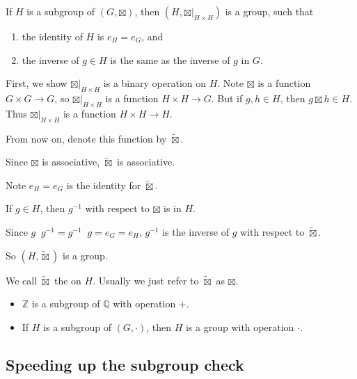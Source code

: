 \documentclass[12pt,letterpaper]{report}
\begin{document}
\begin{prop}{}{}
  If $H$ is a subgroup of $(G, \boxtimes)$, then $(H, \boxtimes \rvert_{H \times H})$ is a group,
  such that
  \begin{enumerate}
    \item the identity of $H$ is $e_H = e_G$, and
    \item the inverse of $g \in H$ is the same as the inverse of $g$ in $G$.
  \end{enumerate}
\end{prop}

\begin{thmproof}
  First, we show $\boxtimes \rvert_{H \times H}$ is a binary operation on $H$.
  Note $\boxtimes$ is a function $G \times G \to G$, so $\boxtimes \rvert_{H \times H}$ is a
  function $H \times H \to G$.
  But if $g, h \in H$, then $g \boxtimes h \in H$.
  Thus $\boxtimes \rvert_{H \times H}$ is a function $H \times H \to H$.

  From now on, denote this function by $\tilde{\boxtimes}$.

  Since $\boxtimes$ is associative, $\tilde{\boxtimes}$ is associative.

  Note $e_H = e_G$ is the identity for $\tilde{\boxtimes}$.

  If $g \in H$, then $g^{-1}$ with respect to $\boxtimes$ is in $H$.

  Since $g \mathop{\tilde{\boxtimes}} g^{-1} = g^{-1} \mathop{\tilde{\boxtimes}} g = e_G = e_H$,
  $g^{-1}$ is the inverse of $g$ with respect to $\tilde{\boxtimes}$.

  So $(H, \tilde{\boxtimes})$ is a group.
\end{thmproof}

We call $\tilde{\boxtimes}$ the  on $H$.
Usually we just refer to $\tilde{\boxtimes}$ as $\boxtimes$.

\begin{ex}
  \begin{itemize}
    \item $\mathbb{Z}$ is a subgroup of $\mathbb{Q}$ with operation $+$.
    \item If $H$ is a subgroup of $(G, \cdot)$, then $H$ is a group with operation $\cdot$.
  \end{itemize}
\end{ex}

\pagebreak
\subsection{Speeding up the subgroup check}
\end{document}
